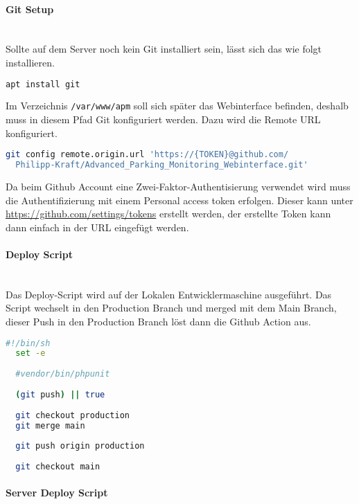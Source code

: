 \paragraph{Git Setup}\mbox{}\\

Sollte auf dem Server noch kein Git installiert sein, lässt sich das wie folgt
installieren.

\begin{lstlisting}[language=bash, caption={Git Installation}]
  apt install git
\end{lstlisting}

Im Verzeichnis \verb|/var/www/apm| soll sich später das Webinterface befinden,
deshalb muss in diesem Pfad Git konfiguriert werden. Dazu wird die Remote URL
konfiguriert.

\begin{lstlisting}[language=bash, caption={Git Remote Origin}]
  git config remote.origin.url 'https://{TOKEN}@github.com/
  Philipp-Kraft/Advanced_Parking_Monitoring_Webinterface.git'
\end{lstlisting}

Da beim Github Account eine Zwei-Faktor-Authentisierung verwendet wird muss die
Authentifizierung mit einem Personal access token erfolgen. Dieser kann unter
\url{https://github.com/settings/tokens} erstellt werden, der erstellte Token
kann dann einfach in der URL eingefügt werden.

\paragraph{Deploy Script}\mbox{}\\

Das Deploy-Script wird auf der Lokalen Entwicklermaschine ausgeführt. Das Script wechselt in den Production Branch und merged mit dem Main Branch, dieser Push in den Production Branch löst dann die Github Action aus.

\begin{lstlisting}[language=bash, caption={phpmyadmin.conf}]
  #!/bin/sh
  set -e
  
  #vendor/bin/phpunit
  
  (git push) || true
  
  git checkout production
  git merge main
  
  git push origin production
  
  git checkout main
\end{lstlisting}

\paragraph{Server Deploy Script}\mbox{}\\

